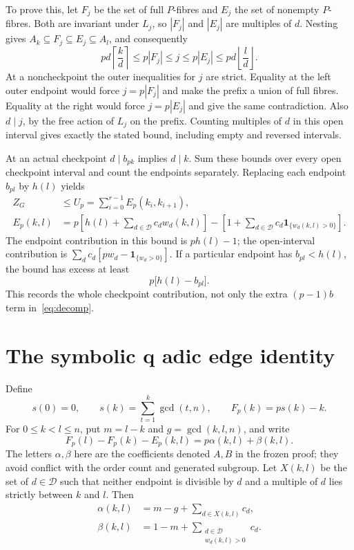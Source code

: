 \documentclass[11pt,letterpaper]{article}
\theoremstyle{definition}
\newcommand{\ind}{\mathbf{1}}
\begin{document}
To prove this, let $F_j$ be the set of full $P$-fibres and $E_j$ the set of nonempty $P$-fibres. Both are invariant under $L_j$, so $|F_j|$ and $|E_j|$ are multiples of $d$. Nesting gives
$A_k\subseteq F_j\subseteq E_j\subseteq A_l$, and consequently
\begin{equation}
pd\left\lceil\frac kd\right\rceil\le p|F_j|\le j\le p|E_j|\le pd\left\lfloor\frac ld\right\rfloor.\label{eq:interval}
\end{equation}
At a noncheckpoint the outer inequalities for $j$ are strict. Equality at the left outer endpoint would force $j=p|F_j|$ and make the prefix a union of full fibres. Equality at the right would force $j=p|E_j|$ and give the same contradiction. Also $d\mid j$, by the free action of $L_j$ on the prefix. Counting multiples of $d$ in this open interval gives exactly the stated bound, including empty and reversed intervals.

At an actual checkpoint $d\mid b_{pk}$ implies $d\mid k$. Sum these bounds over every open checkpoint interval and count the endpoints separately. Replacing each endpoint $b_{pl}$ by $h(l)$ yields
\begin{align}
Z_G&\le U_p=\sum_{i=0}^{r-1}E_p(k_i,k_{i+1}),\label{eq:upper}\\
E_p(k,l)&=p\left[h(l)+\sum_{d\in\mathcal D}c_d w_d(k,l)\right]
-\left[1+\sum_{d\in\mathcal D}c_d\ind_{\{w_d(k,l)>0\}}\right].\label{eq:edge}
\end{align}
The endpoint contribution in this bound is $ph(l)-1$; the open-interval contribution is $\sum_d c_d[pw_d-\ind_{\{w_d>0\}}]$. If a particular endpoint has $b_{pl}<h(l)$, the bound has excess at least
\begin{equation}
p\bigl[h(l)-b_{pl}\bigr].\label{eq:endpointloss}
\end{equation}
This records the whole checkpoint contribution, not only the extra $(p-1)b$ term in~\eqref{eq:decomp}.

\section{The symbolic q adic edge identity}
Define
\begin{equation}
s(0)=0,\qquad s(k)=\sum_{t=1}^k\gcd(t,n),\qquad F_p(k)=ps(k)-k.\label{eq:potential}
\end{equation}
For $0\le k<l\le n$, put $m=l-k$ and $g=\gcd(k,l,n)$, and write
\begin{equation}
F_p(l)-F_p(k)-E_p(k,l)=p\alpha(k,l)+\beta(k,l).\label{eq:loss}
\end{equation}
The letters $\alpha,\beta$ here are the coefficients denoted $A,B$ in the frozen proof; they avoid conflict with the order count and generated subgroup. Let $X(k,l)$ be the set of $d\in\mathcal D$ such that neither endpoint is divisible by $d$ and a multiple of $d$ lies strictly between $k$ and $l$. Then
\begin{align}
\alpha(k,l)&=m-g+\sum_{d\in X(k,l)}c_d,\label{eq:alpha}\\
\beta(k,l)&=1-m+\sum_{\substack{d\in\mathcal D\\w_d(k,l)>0}}c_d.\label{eq:beta}
\end{align}
\end{document}
